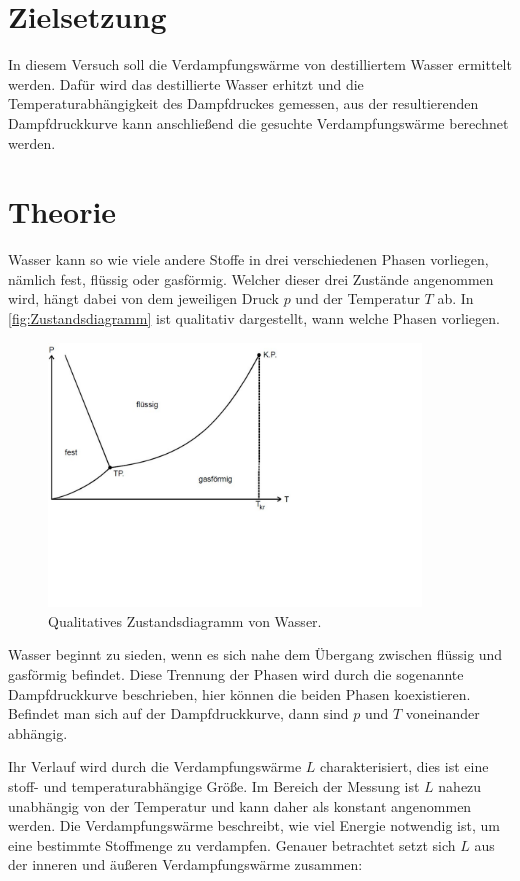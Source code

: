 \section{Zielsetzung}
\label{sec:Zielsetzung}

In diesem Versuch soll die Verdampfungswärme von destilliertem Wasser ermittelt werden.
Dafür wird das destillierte Wasser erhitzt und die Temperaturabhängigkeit des Dampfdruckes gemessen, 
aus der resultierenden Dampfdruckkurve kann anschließend die gesuchte Verdampfungswärme berechnet werden.

\section{Theorie}
\label{sec:Theorie}

Wasser kann so wie viele andere Stoffe in drei verschiedenen Phasen vorliegen, nämlich fest, flüssig oder gasförmig.
Welcher dieser drei Zustände angenommen wird, hängt dabei von dem jeweiligen Druck $p$ und der Temperatur $T$ ab.
In \autoref{fig:Zustandsdiagramm} ist qualitativ dargestellt, wann welche Phasen vorliegen.

\begin{figure} [H]
    \centering
    \includegraphics[height=7cm]{content/Bilder/Zustandsdiagramm.pdf}
    \caption{Qualitatives Zustandsdiagramm von Wasser. \cite{v203}}
    \label{fig:Zustandsdiagramm}
\end{figure}

Wasser beginnt zu sieden, wenn es sich nahe dem Übergang zwischen flüssig und gasförmig befindet.
Diese Trennung der Phasen wird durch die sogenannte Dampfdruckkurve beschrieben, hier können die beiden Phasen koexistieren.
Befindet man sich auf der Dampfdruckkurve, dann sind $p$ und $T$ voneinander abhängig.

Ihr Verlauf wird durch die Verdampfungswärme $L$ charakterisiert, dies ist eine stoff- und temperaturabhängige Größe.
Im Bereich der Messung ist $L$ nahezu unabhängig von der Temperatur und kann daher als konstant angenommen werden.
Die Verdampfungswärme beschreibt, wie viel Energie notwendig ist, um eine bestimmte Stoffmenge zu verdampfen.
Genauer betrachtet setzt sich $L$ aus der inneren und äußeren Verdampfungswärme zusammen:

